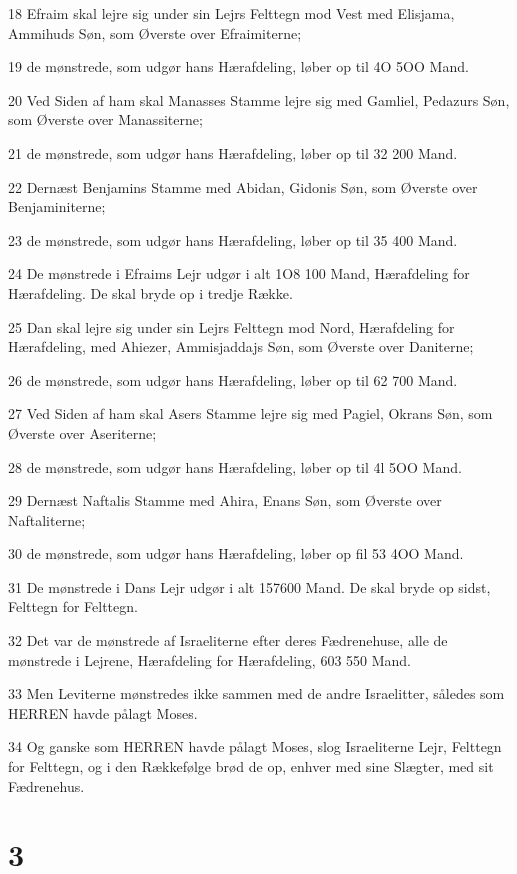 \par 18 Efraim skal lejre sig under sin Lejrs Felttegn mod Vest med Elisjama, Ammihuds Søn, som Øverste over Efraimiterne;
\par 19 de mønstrede, som udgør hans Hærafdeling, løber op til 4O 5OO Mand.
\par 20 Ved Siden af ham skal Manasses Stamme lejre sig med Gamliel, Pedazurs Søn, som Øverste over Manassiterne;
\par 21 de mønstrede, som udgør hans Hærafdeling, løber op til 32 200 Mand.
\par 22 Dernæst Benjamins Stamme med Abidan, Gidonis Søn, som Øverste over Benjaminiterne;
\par 23 de mønstrede, som udgør hans Hærafdeling, løber op til 35 400 Mand.
\par 24 De mønstrede i Efraims Lejr udgør i alt 1O8 100 Mand, Hærafdeling for Hærafdeling. De skal bryde op i tredje Række.
\par 25 Dan skal lejre sig under sin Lejrs Felttegn mod Nord, Hærafdeling for Hærafdeling, med Ahiezer, Ammisjaddajs Søn, som Øverste over Daniterne;
\par 26 de mønstrede, som udgør hans Hærafdeling, løber op til 62 700 Mand.
\par 27 Ved Siden af ham skal Asers Stamme lejre sig med Pagiel, Okrans Søn, som Øverste over Aseriterne;
\par 28 de mønstrede, som udgør hans Hærafdeling, løber op til 4l 5OO Mand.
\par 29 Dernæst Naftalis Stamme med Ahira, Enans Søn, som Øverste over Naftaliterne;
\par 30 de mønstrede, som udgør hans Hærafdeling, løber op fil 53 4OO Mand.
\par 31 De mønstrede i Dans Lejr udgør i alt 157600 Mand. De skal bryde op sidst, Felttegn for Felttegn.
\par 32 Det var de mønstrede af Israeliterne efter deres Fædrenehuse, alle de mønstrede i Lejrene, Hærafdeling for Hærafdeling, 603 550 Mand.
\par 33 Men Leviterne mønstredes ikke sammen med de andre Israelitter, således som HERREN havde pålagt Moses.
\par 34 Og ganske som HERREN havde pålagt Moses, slog Israeliterne Lejr, Felttegn for Felttegn, og i den Rækkefølge brød de op, enhver med sine Slægter, med sit Fædrenehus.

\chapter{3}

